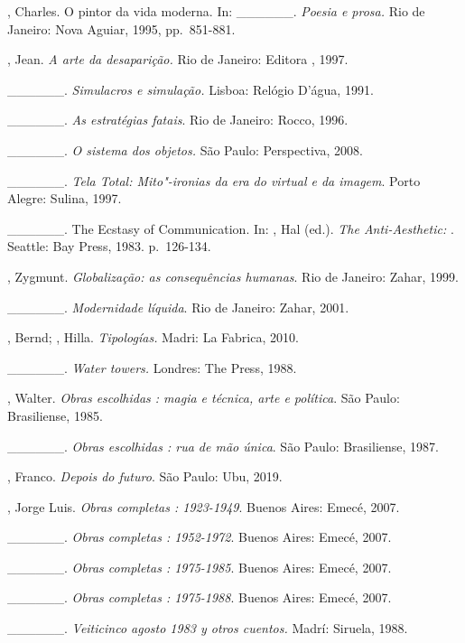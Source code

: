 \begin{Parskip}
, Charles. O pintor da vida moderna. In: \_\_\_\_\_\_.
\emph{Poesia e prosa.} Rio de Janeiro: Nova Aguiar, 1995, pp.~851-881.

, Jean. \emph{A arte da desaparição.} Rio de Janeiro:
Editora , 1997.

\_\_\_\_\_\_. \emph{Simulacros e simulação.} Lisboa: Relógio D'água, 1991.

\_\_\_\_\_\_. \emph{As estratégias fatais}. Rio de Janeiro: Rocco, 1996.

\_\_\_\_\_\_. \emph{O sistema dos objetos.} São Paulo: Perspectiva, 2008.

\_\_\_\_\_\_. \emph{Tela Total: Mito"-ironias da era do virtual e da imagem}. Porto Alegre: Sulina, 1997.

\_\_\_\_\_\_. The Ecstasy of Communication. In: , Hal (ed.). \emph{The Anti-Aesthetic: }. Seattle: Bay Press, 1983. p.~126-134.

, Zygmunt. \emph{Globalização: as consequências humanas}. Rio de
Janeiro: Zahar, 1999.

\_\_\_\_\_\_. \emph{Modernidade líquida}. Rio de Janeiro: Zahar, 2001.

, Bernd; , Hilla. \emph{Tipologías.} Madri: La Fabrica,
2010.

\_\_\_\_\_\_. \emph{Water towers.} Londres: The  Press, 1988.

, Walter. \emph{Obras escolhidas : magia e técnica, arte e
política}. São Paulo: Brasiliense, 1985.

\_\_\_\_\_\_. \emph{Obras escolhidas : rua de mão única}. São
Paulo: Brasiliense, 1987.

, Franco. \emph{Depois do futuro}. São Paulo: Ubu, 2019.

, Jorge Luis. \emph{Obras completas : 1923-1949}. Buenos Aires:
Emecé, 2007.

\_\_\_\_\_\_. \emph{Obras completas : 1952-1972}. Buenos Aires:
Emecé, 2007.

\_\_\_\_\_\_. \emph{Obras completas : 1975-1985}. Buenos Aires:
Emecé, 2007.

\_\_\_\_\_\_. \emph{Obras completas : 1975-1988}. Buenos Aires:
Emecé, 2007.

\_\_\_\_\_\_. \emph{Veiticinco agosto 1983 y otros cuentos.}
Madrí: Siruela, 1988.


\end{Parskip}
